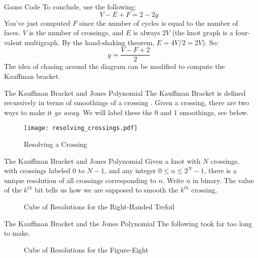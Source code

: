 \documentclass{beamer}
\begin{document}
    \begin{frame}{Gauss Code}
        To conclude, use the following:
        \begin{equation}
            V-E+F=2-2g
        \end{equation}
        You've just computed $F$ since the number of cycles is equal to the
        number of faces. $V$ is the number of crossings, and
        $E$ is always $2V$ (the knot graph is a four-valent multigraph. By the
        hand-shaking theorem, $E=4V/2=2V$). So:
        \begin{equation}
            g=\frac{V-F+2}{2}
        \end{equation}
        The idea of chasing around the diagram can be modified to compute
        the Kauffman bracket.
    \end{frame}
    \begin{frame}{The Kauffman Bracket and Jones Polynomial}
        The Kauffman Bracket is defined recursively in terms of smoothings of a
        crossing \cite[p.~396]{KauffmanStateModels}.
        Given a crossing, there are two ways to make it
        \textit{go away}. We will label these the 0 and 1 smoothings, see below.
        \begin{figure}
            \centering
            \texttt{[image: resolving\_crossings.pdf]}
            \caption{Resolving a Crossing}
            \label{fig:resolving_crossing}
        \end{figure}
    \end{frame}
    \begin{frame}{The Kauffman Bracket and Jones Polynomial}
        Given a knot with $N$ crossings, with crossings labeled 0 to $N-1$,
        and any integer $0\leq{n}\leq{2}^{N}-1$, there is a unique resolution of
        all crossings corresponding to $n$. Write $n$ in binary. The value of
        the $k^{th}$ bit tells us how we are supposed to smooth the $k^{th}$
        crossing.
        \begin{figure}
            \centering
            \caption{Cube of Resolutions for the Right-Handed Trefoil}
            \label{fig:trefoil_knot_cube_of_resolutions}
        \end{figure}
    \end{frame}
    \begin{frame}{The Kauffman Bracket and the Jones Polynomial}
        The following took far too long to make.
        \begin{figure}
            \centering
            \caption{Cube of Resolutions for the Figure-Eight}
            \label{fig:figure_eight_knot_cube_of_resolutions}
        \end{figure}
    \end{frame}
\end{document}
